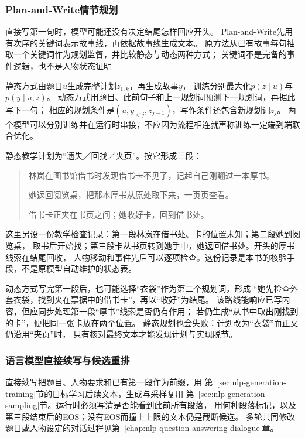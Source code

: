 \subsubsection{Plan-and-Write情节规划}
\label{sec:nlp-generation-plan-write}

直接写第一句时，模型可能还没有决定结尾怎样回应开头。
Plan-and-Write先用有次序的关键词表示故事线，再依据故事线生成文本。
原方法从已有故事每句抽取一个关键词作为规划监督，并比较静态与动态两种方式；
关键词不是完备的事件逻辑，也不是人物状态证明

静态方式由题目$u$生成完整计划$z_{1:k}$，再生成故事$y$，
训练分别最大化$p(z\mid u)$与$p(y\mid u,z)$。
动态方式用题目、此前句子和上一规划词预测下一规划词，再据此写下一句；
相应的规划条件是$(u,y_{<j},z_{j-1})$，写作条件还包含新规划词$z_j$。
两个模型可以分别训练并在运行时串接，不应因为流程相连就声称训练一定端到端联合优化。

静态教学计划为“遗失／回找／夹页”。按它形成三段：
\begin{quote}
林岚在图书馆借书时发现借书卡不见了，记起自己刚翻过一本厚书。

她返回阅览桌，把那本厚书从原处取下来，一页页查看。

借书卡正夹在书页之间；她收好卡，回到借书处。
\end{quote}
这里另设一份教学检查记录：第一段林岚在借书处、卡的位置未知；第二段她到阅览桌，
取书后开始找；第三段卡从书页转到她手中，她返回借书处。开头的厚书线索在结尾回收，
人物移动和事件先后可以逐项检查。这份记录是本书的核验手段，不是原模型自动维护的状态表。

动态方式写完第一段后，也可能选择“衣袋”作为第二个规划词，形成
“她先检查外套衣袋，找到夹在票据中的借书卡”，再以“收好”为结尾。
该路线能响应已写内容，但应同步处理第一段“厚书”线索是否仍有作用；
若仍生成“从书中取出刚找到的卡”，便把同一张卡放在两个位置。
静态规划也会失败：计划改为“衣袋”而正文仍沿用“夹页”时，
只有核对最终文本才能发现计划与实现脱节。

\subsubsection{语言模型直接续写与候选重排}
\label{sec:nlp-generation-continuation}

直接续写把题目、人物要求和已有第一段作为前缀，用
第~\ref{sec:nlp-generation-training}节的目标学习后续文本，生成与采样复用
第~\ref{sec:nlp-generation-sampling}节。运行时必须写清是否能看到此前所有段落，
用何种段落标记，以及第三段结束后的EOS；没有EOS而撞上上限的文本仍是截断候选。
多轮共同修改题目或人物设定的对话过程见第~\ref{chap:nlp-question-answering-dialogue}章。

